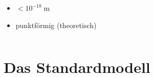 \documentclass{beamer}
\newcommand{\m}{\ensuremath{\;\text{m}}\xspace}
\begin{document}
\begin{frame}
\begin{columns}[T]
\begin{column}{0.75\textwidth}
\begin{columns}
\begin{column}{0.8\textwidth}
{            \begin{itemize}
            \item $<10^{-18}\m$ 
            \item<3-> punktf\"ormig (theoretisch)
            \end{itemize}
          }
        \end{column}
        \begin{column}{0.1\textwidth}
        \end{column}
      \end{columns}
    \end{column}
  \end{columns}
\end{frame}


\section{Das Standardmodell}
\end{document}
